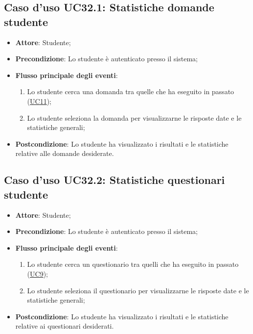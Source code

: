 \documentclass[12pt,a4paper]{article}
\begin{document}
\subsection{Caso d'uso UC32.1: Statistiche domande studente}

\begin{itemize}

\item \textbf{Attore}: Studente; 
\item \textbf{Precondizione}: Lo studente è autenticato presso il sistema;

\item \textbf{Flusso principale degli eventi}:
\begin{enumerate}
	\item Lo studente cerca una domanda tra quelle che ha eseguito in passato (\hyperlink{UC11}{UC11});
	\item Lo studente seleziona la domanda per visualizzarne le risposte date e le statistiche generali;
	
\end{enumerate}
\item \textbf{Postcondizione}: Lo studente ha visualizzato i risultati e le statistiche relative alle domande desiderate.
\end{itemize}
\hypertarget{UC32.2}{}
\subsection{Caso d'uso UC32.2: Statistiche questionari studente}

\begin{itemize}

\item \textbf{Attore}: Studente; 
\item \textbf{Precondizione}: Lo studente è autenticato presso il sistema;

\item \textbf{Flusso principale degli eventi}:
\begin{enumerate}
	\item Lo studente cerca un questionario tra quelli che ha eseguito in passato (\hyperlink{UC9}{UC9});
	\item Lo studente seleziona il questionario per visualizzarne le risposte date e le statistiche generali;
	
\end{enumerate}
\item \textbf{Postcondizione}: Lo studente ha visualizzato i risultati e le statistiche relative ai questionari desiderati.
\end{itemize}
\hypertarget{UC32.3}{}
\end{document}
